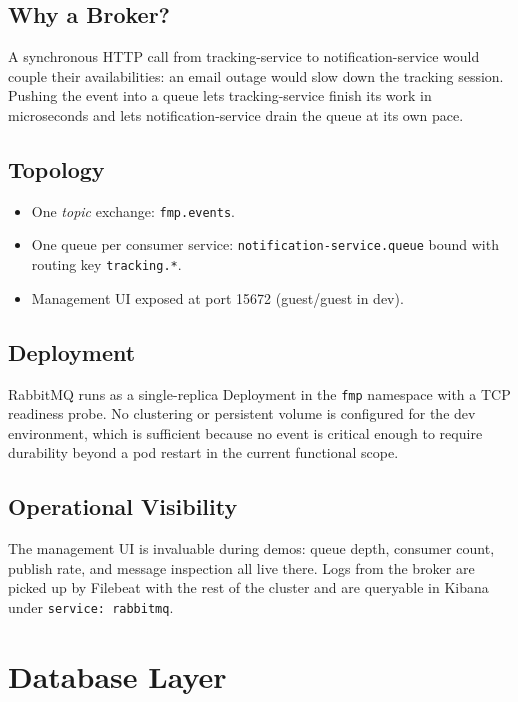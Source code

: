 \documentclass[11pt,a4paper]{article}
\begin{document}
\subsection{Why a Broker?}
A synchronous HTTP call from tracking-service to notification-service
would couple their availabilities: an email outage would slow down
the tracking session.  Pushing the event into a queue lets
tracking-service finish its work in microseconds and lets
notification-service drain the queue at its own pace.

\subsection{Topology}
\begin{itemize}[leftmargin=*]
  \item One \emph{topic} exchange: \texttt{fmp.events}.
  \item One queue per consumer service:
        \texttt{notification-service.queue} bound with routing key
        \texttt{tracking.*}.
  \item Management UI exposed at port 15672 (guest/guest in dev).
\end{itemize}

\subsection{Deployment}
RabbitMQ runs as a single-replica Deployment in the \texttt{fmp}
namespace with a TCP readiness probe.  No clustering or persistent
volume is configured for the dev environment, which is sufficient
because no event is critical enough to require durability beyond a
pod restart in the current functional scope.

\subsection{Operational Visibility}
The management UI is invaluable during demos: queue depth,
consumer count, publish rate, and message inspection all live there.
Logs from the broker are picked up by Filebeat with the rest of the
cluster and are queryable in Kibana under
\texttt{service: rabbitmq}.

\section{Database Layer}
\end{document}
